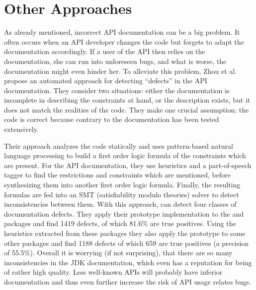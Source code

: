
\section{Other Approaches}

As already mentioned, incorrect API documentation can be a big problem.
It often occurs when an API developer changes the code but forgets to adapt the documentation accordingly.
If a user of the API then relies on the documentation, she can run into unforeseen bugs, and what is worse, the documentation might even hinder her.
To alleviate this problem, Zhou et al.  \cite{zhou2017analyzing} propose an automated approach for detecting ``defects'' in the API documentation.
They consider two situations: either the documentation is incomplete in describing the constraints at hand, or the description exists, but it does not match the realities of the code.
They make one crucial assumption: the code is correct because contrary to the documentation has been tested extensively.

Their approach analyzes the code statically and uses pattern-based natural language processing to build a first order logic formula of the constraints which are present.
For the API documentation, they use heuristics and a part-of-speech tagger to find the restrictions and constraints which are mentioned, before synthesizing them into another first order logic formula.
Finally, the resulting formulas are fed into an SMT (satisfiability modulo theories) solver \cite{barrett2009satisfiability} to detect inconsistencies between them.
With this approach, can detect four classes of documentation defects.
They apply their prototype implementation to the  and  packages and find 1419 defects, of which 81.6\% are true positives.
Using the heuristics extracted from these packages they also apply the prototype to some other packages and find 1188 defects of which 659 are true positives (a precision of 55.5\%).
Overall it is worrying (if not surprising), that there are so many inconsistencies in the JDK documentation, which even has a reputation for being of rather high quality.
Less well-known APIs will probably have inferior documentation and thus even further increase the risk of API usage relates bugs.


